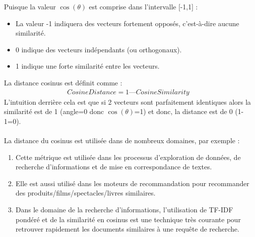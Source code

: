 Puisque la valeur $\cos(\theta)$ est comprise dans l'intervalle [-1,1] :
\begin{itemize}
    \item La valeur -1 indiquera des vecteurs fortement opposés, c'est-à-dire aucune similarité.
    \item 0 indique des vecteurs indépendants (ou orthogonaux).
    \item 1 indique une forte similarité entre les vecteurs.
\end{itemize}
La distance cosinus est définit comme :
\begin{eqnarray}
    Cosine Distance = 1 — Cosine Similarity
\end{eqnarray}
L'intuition derrière cela est que si 2 vecteurs sont parfaitement identiques alors la similarité est de 1 (angle=0 donc $\cos(\theta)$=1) et donc, la distance est de 0 (1-1=0).
\\
\\
La distance du cosinus est utilisée dans de nombreux domaines, par exemple :
\begin{enumerate}
    \item Cette métrique est utilisée dans les processus d'exploration de données, de recherche d'informations et de mise en correspondance de textes.
    \item Elle est aussi utilisé dans les moteurs de recommandation pour recommander des produits/films/spectacles/livres similaires.
    \item Dans le domaine de la recherche d'informations, l'utilisation de TF-IDF pondéré et de la similarité en cosinus est une technique très courante pour retrouver rapidement les documents similaires à une requête de recherche.
\end{enumerate}



\newpage







